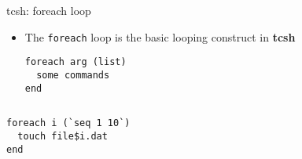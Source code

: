 \documentclass[10pt,t]{beamer}
\begin{document}
\begin{frame}[fragile]{tcsh: foreach loop}
  \begin{block}{}
    \begin{itemize}
      \item The \texttt{foreach} loop is the basic looping construct in \textbf{tcsh}
      \begin{lstlisting}
foreach arg (list)
  some commands
end
      \end{lstlisting}
    \end{itemize}
  \end{block}
  \begin{columns}
    \begin{block}{}
      \begin{lstlisting}
foreach i (`seq 1 10`)
  touch file$i.dat
end
      \end{lstlisting}
    \end{block}
  \end{columns}
\end{frame}
\end{document}
